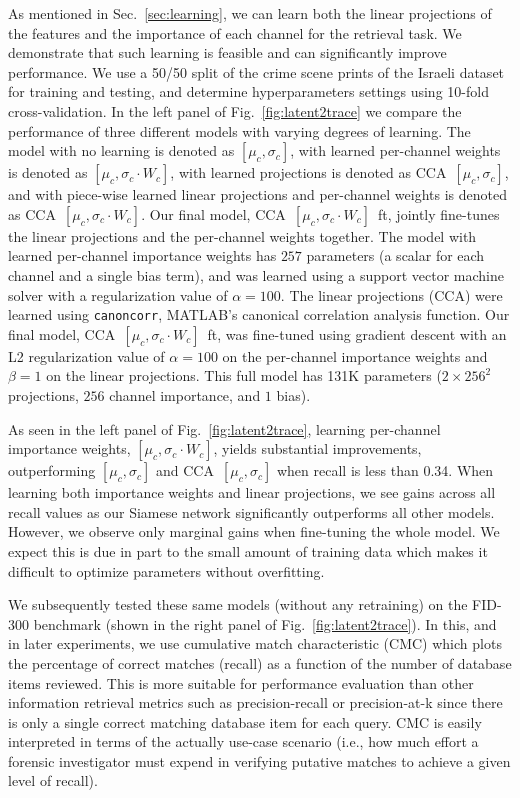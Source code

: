 \documentclass[twocolumn]{svjour3}           %
\begin{document}
As mentioned in Sec.~\ref{sec:learning}, we can learn both the linear
projections of the features and the importance of each channel for the
retrieval task.  We demonstrate that such learning is feasible and can
significantly improve
performance.  We use a 50/50 split of the crime scene prints of the Israeli
dataset for training and testing, and determine hyperparameters settings using
10-fold cross-validation.  In the left panel of Fig.~\ref{fig:latent2trace} we
compare the performance of three different models with varying degrees of
learning.  The model with no learning is denoted as $[\mu_c,\sigma_c]$, with
learned per-channel weights is denoted as $[\mu_c,\sigma_c\cdot W_c]$, with
learned projections is denoted as CCA~$[\mu_c,\sigma_c]$, and with piece-wise
learned linear projections and per-channel weights is denoted as
CCA~$[\mu_c,\sigma_c\cdot W_c]$.  Our final model, CCA~$[\mu_c,\sigma_c\cdot
W_c]$~ft, jointly fine-tunes the linear projections and the per-channel weights
together.  The model with learned per-channel importance weights has $257$
parameters (a scalar for each channel and a single bias term), and was learned
using a support vector machine solver with a regularization value of $\alpha=100$.
The linear projections (CCA) were learned using \texttt{canoncorr}, MATLAB's
canonical correlation analysis function.  Our final model,
CCA~$[\mu_c,\sigma_c\cdot W_c]$~ft, was fine-tuned using gradient descent with 
an L2 regularization value of $\alpha=100$ on the per-channel importance weights
and $\beta=1$ on the linear projections. This full model has 131K parameters
($2\times 256^2$ projections, $256$ channel importance, and $1$ bias).

As seen in the left panel of Fig.~\ref{fig:latent2trace}, learning per-channel
importance weights, $[\mu_c,\sigma_c\cdot W_c]$, yields substantial 
improvements, outperforming $[\mu_c,\sigma_c]$ and CCA~$[\mu_c,\sigma_c]$ when
recall is less than 0.34.  When learning both importance weights and linear
projections, we see gains across all recall values as our Siamese network
significantly outperforms all other models. However, we observe only marginal
gains when fine-tuning the whole model. We expect this is due in part to the
small amount of training data which makes it difficult to optimize parameters
without overfitting.

We subsequently tested these same models (without any retraining) on the
FID-300 benchmark (shown in the right panel of Fig.~\ref{fig:latent2trace}).
In this, and in later experiments, we use cumulative match characteristic
(CMC) which plots the percentage of correct matches (recall) as a function of
the number of database items reviewed. This is more suitable for performance
evaluation than other information retrieval metrics such as precision-recall or
precision-at-k since there is only a single correct matching database item for
each query. CMC is easily interpreted in terms of the actually use-case scenario
(i.e., how much effort a forensic investigator must expend in verifying
putative matches to achieve a given level of recall).
\end{document}
